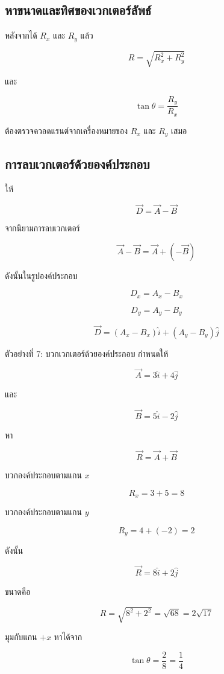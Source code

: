 \subsection{หาขนาดและทิศของเวกเตอร์ลัพธ์}

หลังจากได้ $R_x$ และ $R_y$ แล้ว

\[
R=\sqrt{R_x^2+R_y^2}
\]

และ

\[
\tan\theta=\frac{R_y}{R_x}
\]

ต้องตรวจควอดแรนต์จากเครื่องหมายของ $R_x$ และ $R_y$ เสมอ

\subsection{การลบเวกเตอร์ด้วยองค์ประกอบ}

ให้

\[
\vec{D}=\vec{A}-\vec{B}
\]

จากนิยามการลบเวกเตอร์

\[
\vec{A}-\vec{B}=\vec{A}+(-\vec{B})
\]

ดังนั้นในรูปองค์ประกอบ

\[
D_x=A_x-B_x
\]

\[
D_y=A_y-B_y
\]

\[
\vec{D}=(A_x-B_x)\hat{i}+(A_y-B_y)\hat{j}
\]

\begin{examplebox}{ตัวอย่างที่ 7: บวกเวกเตอร์ด้วยองค์ประกอบ}
กำหนดให้

\[
\vec{A}=3\hat{i}+4\hat{j}
\]

และ

\[
\vec{B}=5\hat{i}-2\hat{j}
\]

หา

\[
\vec{R}=\vec{A}+\vec{B}
\]

บวกองค์ประกอบตามแกน $x$

\[
R_x=3+5=8
\]

บวกองค์ประกอบตามแกน $y$

\[
R_y=4+(-2)=2
\]

ดังนั้น

\[
\vec{R}=8\hat{i}+2\hat{j}
\]

ขนาดคือ

\[
R=\sqrt{8^2+2^2}=\sqrt{68}=2\sqrt{17}
\]

มุมกับแกน $+x$ หาได้จาก

\[
\tan\theta=\frac{2}{8}=\frac{1}{4}
\]
\end{examplebox}

